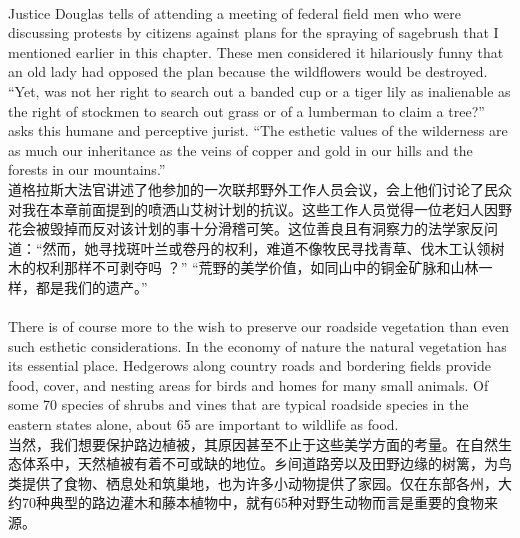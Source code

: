 \documentclass{article}
\begin{document}
\\
Justice Douglas tells of attending a meeting of federal field men who were discussing protests by citizens against plans for the spraying of sagebrush that I mentioned earlier in this chapter. These men considered it hilariously funny that an old lady had opposed the plan because the wildflowers would be destroyed. “Yet, was not her right to search out a banded cup or a tiger lily as inalienable as the right of stockmen to search out grass or of a lumberman to claim a tree?” asks this humane and perceptive jurist. “The esthetic values of the wilderness are as much our inheritance as the veins of copper and gold in our hills and the forests in our mountains.”\\
道格拉斯大法官讲述了他参加的一次联邦野外工作人员会议，会上他们讨论了民众对我在本章前面提到的喷洒山艾树计划的抗议。这些工作人员觉得一位老妇人因野花会被毁掉而反对该计划的事十分滑稽可笑。这位善良且有洞察力的法学家反问道：“然而，她寻找斑叶兰或卷丹的权利，难道不像牧民寻找青草、伐木工认领树木的权利那样不可剥夺吗 ？” “荒野的美学价值，如同山中的铜金矿脉和山林一样，都是我们的遗产。” \\

\\
There is of course more to the wish to preserve our roadside vegetation than even such esthetic considerations. In the economy of nature the natural vegetation has its essential place. Hedgerows along country roads and bordering fields provide food, cover, and nesting areas for birds and homes for many small animals. Of some 70 species of shrubs and vines that are typical roadside species in the eastern states alone, about 65 are important to wildlife as food.\\
当然，我们想要保护路边植被，其原因甚至不止于这些美学方面的考量。在自然生态体系中，天然植被有着不可或缺的地位。乡间道路旁以及田野边缘的树篱，为鸟类提供了食物、栖息处和筑巢地，也为许多小动物提供了家园。仅在东部各州，大约70种典型的路边灌木和藤本植物中，就有65种对野生动物而言是重要的食物来源。 \\ 
\end{document}
